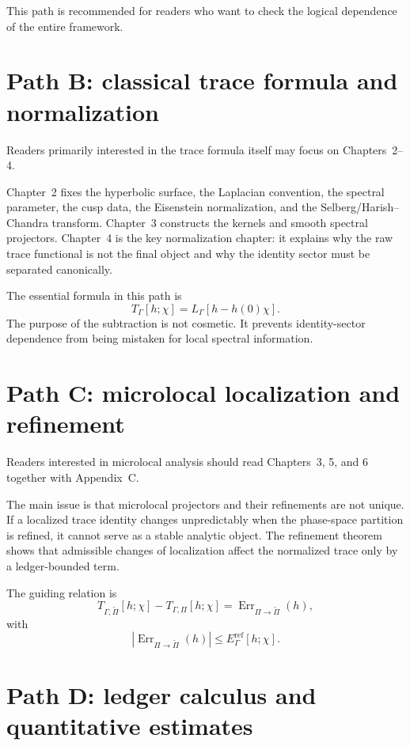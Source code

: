 This path is recommended for readers who want to check the logical dependence of the entire framework.

\section*{Path B: classical trace formula and normalization}

Readers primarily interested in the trace formula itself may focus on Chapters~2--4.

Chapter~2 fixes the hyperbolic surface, the Laplacian convention, the spectral parameter, the cusp data, the Eisenstein normalization, and the Selberg/Harish--Chandra transform.  Chapter~3 constructs the kernels and smooth spectral projectors.  Chapter~4 is the key normalization chapter: it explains why the raw trace functional is not the final object and why the identity sector must be separated canonically.

The essential formula in this path is
\[
  T_\Gamma[h;\chi]
  =
  L_\Gamma[h-h(0)\chi].
\]
The purpose of the subtraction is not cosmetic.  It prevents identity-sector dependence from being mistaken for local spectral information.

\section*{Path C: microlocal localization and refinement}

Readers interested in microlocal analysis should read Chapters~3, 5, and 6 together with Appendix~C.

The main issue is that microlocal projectors and their refinements are not unique.  If a localized trace identity changes unpredictably when the phase-space partition is refined, it cannot serve as a stable analytic object.  The refinement theorem shows that admissible changes of localization affect the normalized trace only by a ledger-bounded term.

The guiding relation is
\[
  T_{\Gamma,\widetilde{\Pi}}[h;\chi]
  -
  T_{\Gamma,\Pi}[h;\chi]
  =
  \operatorname{Err}_{\Pi\to\widetilde{\Pi}}(h),
\]
with
\[
  \left|
  \operatorname{Err}_{\Pi\to\widetilde{\Pi}}(h)
  \right|
  \le
  E_{\Gamma}^{\mathrm{ref}}[h;\chi].
\]

\section*{Path D: ledger calculus and quantitative estimates}

